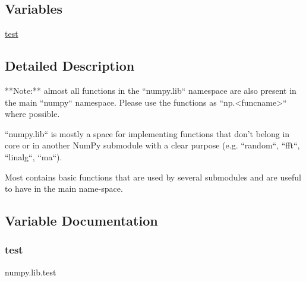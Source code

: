 \subsection*{Variables}
\begin{DoxyCompactItemize}
\item 
\hyperlink{namespacenumpy_1_1lib_a544e3a83e32cb3eb085fc525a747d055}{test}
\end{DoxyCompactItemize}


\subsection{Detailed Description}
\begin{DoxyVerb}**Note:** almost all functions in the ``numpy.lib`` namespace
are also present in the main ``numpy`` namespace.  Please use the
functions as ``np.<funcname>`` where possible.

``numpy.lib`` is mostly a space for implementing functions that don't
belong in core or in another NumPy submodule with a clear purpose
(e.g. ``random``, ``fft``, ``linalg``, ``ma``).

Most contains basic functions that are used by several submodules and are
useful to have in the main name-space.\end{DoxyVerb}
 

\subsection{Variable Documentation}
\mbox{\label{namespacenumpy_1_1lib_a544e3a83e32cb3eb085fc525a747d055}} 
\subsubsection{\texorpdfstring{test}{test}}
{\footnotesize\ttfamily numpy.\+lib.\+test}

